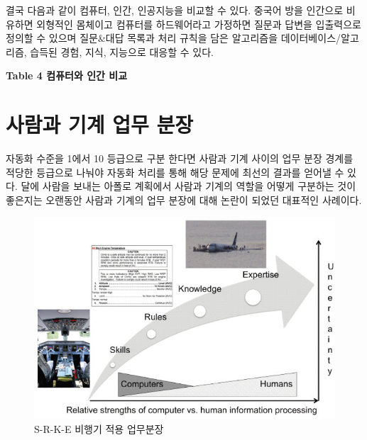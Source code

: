 \documentclass[smallextended]{svjour3}       %
\begin{document}
결국 다음과 같이 컴퓨터, 인간, 인공지능을 비교할 수 있다. 중국어 방을
인간으로 비유하면 외형적인 몸체이고 컴퓨터를 하드웨어라고 가정하면
질문과 답변을 입출력으로 정의할 수 있으며 질문\&대답 목록과 처리 규칙을
담은 알고리즘을 데이터베이스/알고리즘, 습득된 경험, 지식, 지능으로
대응할 수 있다.

\begin{table}[H]
\centering
{}
\end{table}

\textbf{Table 4 컴퓨터와 인간 비교}

\hypertarget{man-human-boundary}{%
\section{사람과 기계 업무 분장}\label{man-human-boundary}}

자동화 수준을 1에서 10 등급으로 구분 한다면 사람과 기계 사이의 업무 분장
경계를 적당한 등급으로 나눠야 자동화 처리를 통해 해당 문제에 최선의
결과를 얻어낼 수 있다. 달에 사람을 보내는 아폴로 계획에서 사람과 기계의
역할을 어떻게 구분하는 것이 좋은지는 오랜동안 사람과 기계의 업무 분장에
대해 논란이 되었던 대표적인 사례이다.

\begin{figure}

{\centering \includegraphics[width=0.77\linewidth]{fig/role-allocation-skill-rules-experties} 

}

\caption{S-R-K-E 비행기 적용 업무분장}\label{fig:unnamed-chunk-5}
\end{figure}
\end{document}
